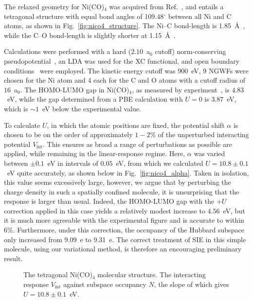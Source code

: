 The relaxed geometry for Ni(CO)$_4$ 
was acquired from Ref.~\cite{doi:10.1063/1.437911}, 
and entails a tetragonal structure 
with equal bond angles of 109.48$^\circ$
between all Ni and C atoms, 
as shown in Fig.~\ref{fig:nico4_structure}.
%
The Ni--C bond-length is 1.85~\AA\ , 
while the C--O bond-length is slightly 
shorter at 1.15~\AA\ .

Calculations were performed 
with a hard ($2.10$~a$_0$ cutoff) 
norm-conserving pseudopotential~\cite{PhysRevB.41.1227}, 
an LDA was used for the XC functional, 
and open boundary conditions~\cite{:/content/aip/journal/jcp/110/6/10.1063/1.477923} 
were employed.
%
The kinetic energy cutoff was 900~eV, 
9 NGWFs were chosen for the Ni atom 
and 4 each for the C and O atoms 
with a cutoff radius of $16$~a$_0$.
%
The HOMO-LUMO gap in Ni(CO)$_4$, 
as measured by experiment~\cite{doi:10.1021/ja00274a073}, 
is $4.83$~eV, 
while the gap determined from a PBE calculation with $U=0$
is $3.87$~eV, 
which is $\sim1$~eV below the experimental value. 

To calculate $U$, 
{in which the atomic positions are fixed},
the potential shift $\alpha$ 
is chosen to be on the order of approximately $1-2\%$ 
of the unperturbed interacting potential $V_\textrm{int}$.
%
This ensures as broad a range of perturbations 
as possible are applied, 
while remaining in the linear-response regime.
%
Here, 
$\alpha$ was varied between $\pm0.1$~eV 
in intervals of $0.05$~eV, 
from which 
we calculated $U=10.8\pm0.1$~eV quite accurately, 
as shown below in Fig.~\ref{fig:nico4_alpha}.
%
Taken in isolation, this value seems excessively large, 
however, we argue that by perturbing the charge density 
in such a spatially confined molecule, 
it is unsurprising that the response is larger than usual. 
%
Indeed, the HOMO-LUMO 
gap with the +$U$ correction applied in this case 
yields a relatively modest increase to $4.56$~eV, 
but it is much more agreeable with 
the experimental figure and 
is accurate to within 6\%.
%
{
Furthermore, under this correction, 
the occupancy of the Hubbard subspace 
only increased from 9.09~e to 9.31~e.}
%
The correct treatment of SIE in this simple molecule, 
using our variational method, 
is therefore an encouraging preliminary result.

\begin{figure}[th!]
\centering
{}
\quad
%
%
\caption[Ni(CO)$_4$ molecular structure and linear-response calculation]
{ 
The tetragonal Ni(CO)$_4$ molecular structure.
The interacting response $V_\textrm{int}$ 
against subspace occupancy $N$, 
the slope of which gives $U=10.8\pm0.1$~eV.}
\end{figure}


